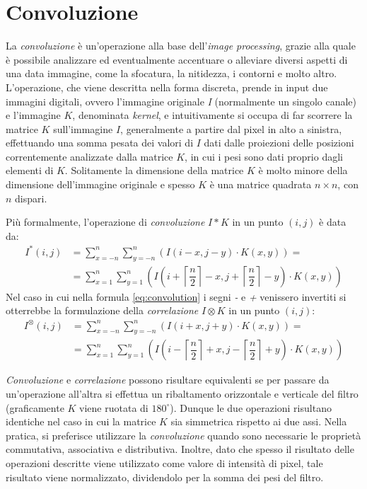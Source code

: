 \section{Convoluzione}
\label{sec:math-convolution}
La \textit{convoluzione} \`e un'operazione alla base dell'\textit{image processing}, grazie alla quale \`e possibile analizzare ed eventualmente accentuare o alleviare diversi aspetti di una data immagine, come la sfocatura, la nitidezza, i contorni e molto altro. L'operazione, che viene descritta nella forma discreta, prende in input due immagini digitali, ovvero l'immagine originale \textit{I} (normalmente un singolo canale) e l'immagine $K$, denominata \textit{kernel}, e intuitivamente si occupa di far scorrere la matrice $K$ sull'immagine $I$, generalmente a partire dal pixel in alto a sinistra, effettuando una somma pesata dei valori di $I$ dati dalle proiezioni delle posizioni correntemente analizzate dalla matrice $K$, in cui i pesi sono dati proprio dagli elementi di $K$. Solitamente la dimensione della matrice $K$ \`e molto minore della dimensione dell'immagine originale e spesso $K$ \`e una matrice quadrata $n\times n$, con $n$ dispari.\par
Pi\`u formalmente, l'operazione di \textit{convoluzione} $I * K$ in un punto $(i,j)$ \`e data da:
\begin{equation}
	\label{eq:convolution}
	\begin{split}
		I^{*}(i, j) & = \sum_{x = -n}^{n}\sum_{y = -n}^{n}(I(i-x, j-y)\cdot K(x,y))=\\
		& = \sum_{x = 1}^{n}\sum_{y = 1}^{n}(I(i + \left\lceil{\dfrac{n}{2}}\right\rceil - x, j + \left\lceil{\dfrac{n}{2}}\right\rceil - y)\cdot K(x,y))
	\end{split}
\end{equation}
Nel caso in cui nella formula \ref{eq:convolution} i segni \textit{-} e \textit{+} venissero invertiti si otterrebbe la formulazione della \textit{correlazione} $I \otimes K$ in un punto $(i,j)$:
\begin{equation}
	\label{eq:correlation}
	\begin{split}
		I^{\otimes}(i, j) & = \sum_{x = -n}^{n}\sum_{y = -n}^{n}(I(i+x, j+y)\cdot K(x,y))=\\
		& = \sum_{x = 1}^{n}\sum_{y = 1}^{n}(I(i - \left\lceil{\dfrac{n}{2}}\right\rceil + x, j - \left\lceil{\dfrac{n}{2}}\right\rceil + y)\cdot K(x,y))
	\end{split}
\end{equation}\par
\textit{Convoluzione} e \textit{correlazione} possono risultare equivalenti se per passare da un'operazione all'altra si effettua un ribaltamento orizzontale e verticale del filtro (graficamente $K$ viene ruotata di $180^{\circ}$). Dunque le due operazioni risultano identiche nel caso in cui la matrice $K$ sia simmetrica rispetto ai due assi. Nella pratica, si preferisce utilizzare la \textit{convoluzione} quando sono necessarie le propriet\`a commutativa, associativa e distributiva. Inoltre, dato che spesso il risultato delle operazioni descritte viene utilizzato come valore di intensit\`a di pixel, tale risultato viene normalizzato, dividendolo per la somma dei pesi del filtro.\par
